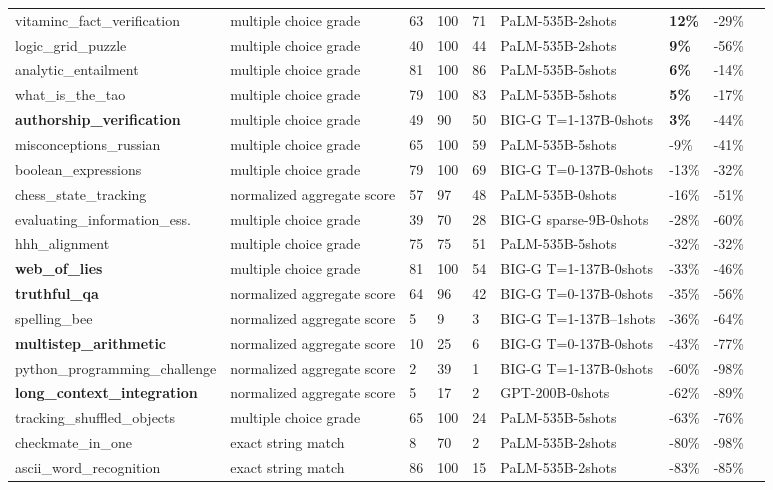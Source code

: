 \documentclass[acmsmall]{acmart}
\begin{document}
\begin{table}[!htp]
\begin{tabular}{l T V{1cm}V{1cm}V{1cm}MV{1cm}V{1cm}V{1cm}}
vitaminc\_fact\_verification &multiple choice grade &63 &100 &71 &PaLM-535B-2shots & \textbf{12\%} &-29\% \\
logic\_grid\_puzzle &multiple choice grade &40 &100 &44 &PaLM-535B-2shots & \textbf{9\%} &-56\% \\
analytic\_entailment &multiple choice grade &81 &100 &86 &PaLM-535B-5shots & \textbf{6\%} &-14\% \\
what\_is\_the\_tao &multiple choice grade &79 &100 &83 &PaLM-535B-5shots & \textbf{5\%} &-17\% \\
\textbf{authorship\_verification} &multiple choice grade &49 &90 &50 &BIG-G T=1-137B-0shots & \textbf{3\%} &-44\% \\
misconceptions\_russian &multiple choice grade &65 &100 &59 &PaLM-535B-5shots &-9\% &-41\% \\
boolean\_expressions &multiple choice grade &79 &100 &69 &BIG-G T=0-137B-0shots &-13\% &-32\% \\
chess\_state\_tracking &normalized aggregate score &57 &97 &48 &PaLM-535B-0shots &-16\% &-51\% \\
evaluating\_information\_ess.  &multiple choice grade &39 &70 &28 &BIG-G sparse-9B-0shots &-28\% &-60\% \\
hhh\_alignment &multiple choice grade &75 &75 &51 &PaLM-535B-5shots &-32\% &-32\% \\
\textbf{web\_of\_lies} &multiple choice grade &81 &100 &54 &BIG-G T=1-137B-0shots &-33\% &-46\% \\
\textbf{truthful\_qa} &normalized aggregate score &64 &96 &42 &BIG-G T=0-137B-0shots &-35\% &-56\% \\
spelling\_bee &normalized aggregate score &5 &9 &3 &BIG-G T=1-137B--1shots &-36\% &-64\% \\
\textbf{multistep\_arithmetic} &normalized aggregate score &10 &25 &6 &BIG-G T=0-137B-0shots &-43\% &-77\% \\
python\_programming\_challenge &normalized aggregate score &2 &39 &1 &BIG-G T=1-137B-0shots &-60\% &-98\% \\
\textbf{long\_context\_integration} &normalized aggregate score &5 &17 &2 &GPT-200B-0shots &-62\% &-89\% \\
tracking\_shuffled\_objects &multiple choice grade &65 &100 &24 &PaLM-535B-5shots &-63\% &-76\% \\
checkmate\_in\_one &exact string match &8 &70 &2 &PaLM-535B-2shots &-80\% &-98\% \\
ascii\_word\_recognition &exact string match &86 &100 &15 &PaLM-535B-2shots &-83\% &-85\% \\
\bottomrule
\end{tabular}
\end{table}
\end{document}
